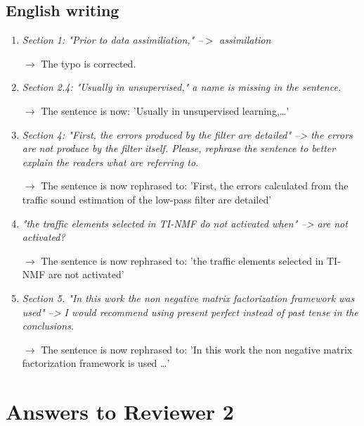 \documentclass[10pt]{article}
\begin{document}
\subsection{English writing}

\begin{enumerate}
\item \emph{Section 1: "Prior to data assimiliation," --$>$ assimilation}

$\rightarrow$ The typo is corrected.

\item \emph{Section 2.4: "Usually in unsupervised," a name is missing in the sentence.}

$\rightarrow$ The sentence is now: 'Usually in unsupervised learning,…'

\item \emph{Section 4:
"First, the errors produced by the filter are detailed" --> the errors are not produce by the filter itself. Please, rephrase the sentence to better explain the readers what are referring to.}

$\rightarrow$ The sentence is now rephrased to: 'First, the errors calculated from the traffic sound estimation of the low-pass filter are detailed'

\item \emph{"the traffic elements selected in TI-NMF do not activated when" --> are not activated?}

$\rightarrow$ The sentence is now rephrased to: 'the traffic elements selected in TI-NMF are not activated'

\item \emph{Section 5. "In this work the non negative matrix factorization framework was used" --> I would recommend using present perfect instead of past tense in the conclusions.}

$\rightarrow$ The sentence is now rephrased to: 'In this work the non negative matrix factorization framework is used \dots'

\end{enumerate}

\section{Answers to Reviewer 2}
\end{document}
